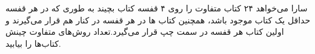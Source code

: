 \p
سارا می‌خواهد ۲۴ کتاب متفاوت را روی ۴ قفسه کتاب بچیند به طوری که در هر قفسه حداقل یک کتاب موجود باشد، همچنین کتاب ها در هر قفسه در کنار هم قرار می‌گیرند و اولین کتاب هر قفسه در سمت چپ قرار می‌گیرد.تعداد روش‌های متفاوت چینش کتاب‌ها را بیابید.
